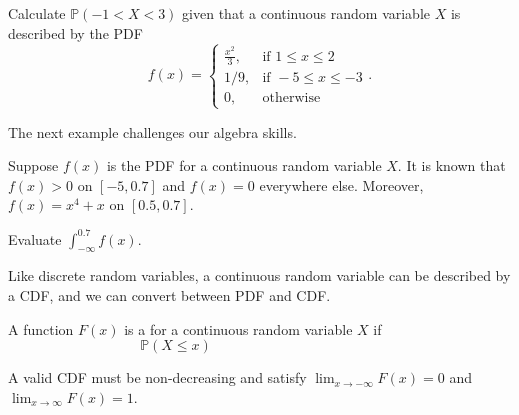 \documentclass[../main.tex]{subfiles}
\begin{document}
\begin{example}
  Calculate \(\mathbb{P}(-1 < X < 3)\) given that a continuous random variable \(X\) is described by the PDF
  \[
    f(x) = 
    \begin{cases}
      \frac{x^{2}}{3}, & \text{if } 1 \le x \le 2 \\
      1/9, & \text{if } -5 \le x \le -3 \\
      0, &\text{otherwise}
    \end{cases}.
  \]

\end{example}

The next example challenges our algebra skills.
\begin{example}
  Suppose \(f(x)\) is the PDF for a continuous random variable \(X\).  It is known that \(f(x) > 0\) on \([-5,0.7]\) and \(f(x) = 0\) everywhere else.  Moreover, \(f(x) = x^{4} + x\) on \([0.5, 0.7]\).  

  Evaluate \(\int_{-\infty}^{0.7} f(x)\). 

\end{example}
\clearpage

Like discrete random variables, a continuous random variable can be described by a CDF, and we can convert between PDF and CDF. 

\begin{definition}
  A function \(F(x)\) is a  for a continuous random variable \(X\) if
  \[
    \mathbb{P}(X \le x) \hspace{2in}
  \]
\end{definition}

\faStar{} A valid CDF must be non-decreasing and satisfy \(\lim_{x \to -\infty} F(x) = 0\) and \(\lim_{x \to \infty} F(x) = 1\).
\end{document}

